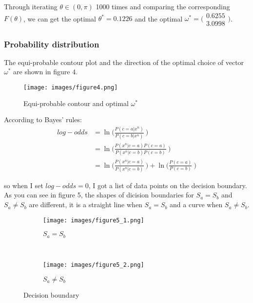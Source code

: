 \documentclass[a4paper, 12pt]{article}
\begin{document}
    Through iterating $\theta \in (0,\pi)$ 1000 times and comparing the corresponding $F(\theta)$, we can get the optimal $\theta^* = 0.1226$ and the optimal 
    $\omega^* = 
    \Big(
    \begin{array}{cc}
    0.6255 \\
    3.0998
    \end{array}
    \Big)$.

    \subsubsection{Probability distribution}
    The equi-probable contour plot and the direction of the optimal choice of vector $\omega^*$ are shown in figure 4.
    
    \begin{figure}[h]
    \centering
    \texttt{[image: images/figure4.png]} 
    \caption{Equi-probable contour and optimal $\omega^*$}
    \end{figure}

    According to Bayes' rules:
    \begin{equation*}
      \begin{aligned}
    log-odds&= \ln\bigg( \frac{P(c=a|x^n)}{P(c=b|x^n)}\ \bigg) \\
            &= \ln \bigg( \frac{P(x^n|c=a)P(c=a)}{P(x^n|c=b)P(c=b)}\  \bigg) \\
            &= \ln\bigg(\frac{P(x^n|c=a)}{P(x^n|c=b)}\ \bigg) + \ln\bigg(\frac{P(c=a)}{P(c=b)}\ \bigg)
      \end{aligned}
    \end{equation*}

    so when I set $log-odds=0$, I got a list of data points on the decision boundary. As you can see in figure 5, the shapes of dicision boundaries for $S_a = S_b$ and $S_a \neq S_b$ are different, it is a straight line when $S_a = S_b$ and a curve when $S_a \neq S_b$.

    \begin{figure}[h]
      \centering
      \begin{subfigure}[b]{0.45\textwidth}
        \centering
        \texttt{[image: images/figure5\_1.png]}
        \caption{$S_a = S_b$}
      \end{subfigure}%
      ~
      \begin{subfigure}[b]{0.45\textwidth}
        \centering 
        \texttt{[image: images/figure5\_2.png]}
        \caption{$S_a \neq S_b$}
      \end{subfigure}
      \caption{Decision boundary}
    \end{figure}
\end{document}

